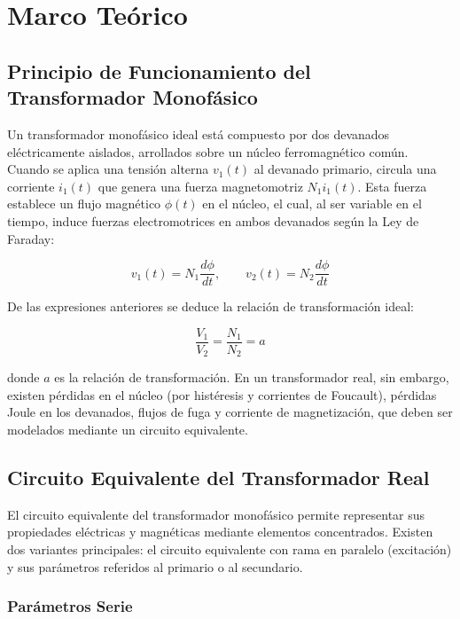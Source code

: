 \section{Marco Teórico}

\subsection{Principio de Funcionamiento del Transformador Monofásico}

Un transformador monofásico ideal está compuesto por dos devanados eléctricamente aislados, arrollados sobre un núcleo ferromagnético común. Cuando se aplica una tensión alterna $v_1(t)$ al devanado primario, circula una corriente $i_1(t)$ que genera una fuerza magnetomotriz $N_1i_1(t)$. Esta fuerza establece un flujo magnético $\phi(t)$ en el núcleo, el cual, al ser variable en el tiempo, induce fuerzas electromotrices en ambos devanados según la Ley de Faraday:

\begin{equation}
v_1(t)=N_1\frac{d\phi}{dt},\qquad v_2(t)=N_2\frac{d\phi}{dt}
\end{equation}

De las expresiones anteriores se deduce la relación de transformación ideal:

\begin{equation}
\frac{V_1}{V_2}=\frac{N_1}{N_2}=a
\end{equation}

donde $a$ es la relación de transformación. En un transformador real, sin embargo, existen pérdidas en el núcleo (por histéresis y corrientes de Foucault), pérdidas Joule en los devanados, flujos de fuga y corriente de magnetización, que deben ser modelados mediante un circuito equivalente.

\subsection{Circuito Equivalente del Transformador Real}

El circuito equivalente del transformador monofásico permite representar sus propiedades eléctricas y magnéticas mediante elementos concentrados. Existen dos variantes principales: el circuito equivalente con rama en paralelo (excitación) y sus parámetros referidos al primario o al secundario.

\subsubsection{Parámetros Serie}

